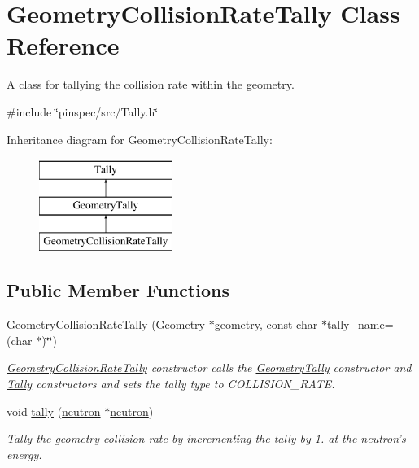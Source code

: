 \hypertarget{classGeometryCollisionRateTally}{\section{Geometry\-Collision\-Rate\-Tally Class Reference}
\label{classGeometryCollisionRateTally}
}


A class for tallying the collision rate within the geometry.  




{\ttfamily \#include \char`\"{}pinspec/src/\-Tally.\-h\char`\"{}}

Inheritance diagram for Geometry\-Collision\-Rate\-Tally\-:\begin{figure}[H]
\begin{center}
\leavevmode
\includegraphics[height=3.000000cm]{classGeometryCollisionRateTally}
\end{center}
\end{figure}
\subsection*{Public Member Functions}
\begin{DoxyCompactItemize}
\item 
\hyperlink{classGeometryCollisionRateTally_a7227a1c5cf9e9490f52fc197e47e0bae}{Geometry\-Collision\-Rate\-Tally} (\hyperlink{classGeometry}{Geometry} $\ast$geometry, const char $\ast$tally\-\_\-name=(char $\ast$)\char`\"{}\char`\"{})
\begin{DoxyCompactList}\small\item\em \hyperlink{classGeometryCollisionRateTally}{Geometry\-Collision\-Rate\-Tally} constructor calls the \hyperlink{classGeometryTally}{Geometry\-Tally} constructor and \hyperlink{classTally}{Tally} constructors and sets the tally type to C\-O\-L\-L\-I\-S\-I\-O\-N\-\_\-\-R\-A\-T\-E. \end{DoxyCompactList}\item 
void \hyperlink{classGeometryCollisionRateTally_af0b0c1c09c8dbdc5453feb8366600dc0}{tally} (\hyperlink{structneutron}{neutron} $\ast$\hyperlink{structneutron}{neutron})
\begin{DoxyCompactList}\small\item\em \hyperlink{classTally}{Tally} the geometry collision rate by incrementing the tally by 1. at the neutron's energy. \end{DoxyCompactList}\end{DoxyCompactItemize}
